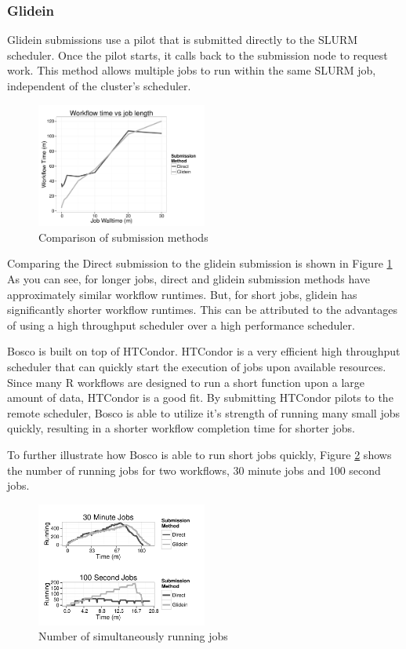 \documentclass[conference]{IEEEtran}
\begin{document}
\subsubsection{Glidein}
Glidein submissions use a pilot that is submitted directly to the SLURM scheduler.  Once the pilot starts, it calls back to the submission node to request work.  This method allows multiple jobs to run within the same SLURM job, independent of the cluster's scheduler.  

\begin{figure}[ht!]
\centering
\includegraphics[width=0.5\textwidth]{images/ComparisonPlot.pdf}
\caption{Comparison of submission methods}
\label{fig:comparesubmit}
\end{figure}

Comparing the Direct submission to the glidein submission is shown in Figure \ref{fig:comparesubmit}  As you can see, for longer jobs, direct and glidein submission methods have approximately similar workflow runtimes.  But, for short jobs, glidein has significantly shorter workflow runtimes.  This can be attributed to the advantages of using a high throughput scheduler over a high performance scheduler.

Bosco is built on top of HTCondor.  HTCondor is a very efficient high throughput scheduler that can quickly start the execution of jobs upon available resources.  Since many R workflows are designed to run a short function upon a large amount of data, HTCondor is a good fit.  By submitting HTCondor pilots to the remote scheduler, Bosco is able to utilize it's strength of running many small jobs quickly, resulting in a shorter workflow completion time for shorter jobs.

To further illustrate how Bosco is able to run short jobs quickly, Figure \ref{fig:runningjobs} shows the number of running jobs for two workflows, 30 minute jobs and 100 second jobs.

\begin{figure}[ht!]
\centering
\includegraphics[width=0.5\textwidth]{images/NumberRunning.pdf}

\caption{Number of simultaneously running jobs}
\label{fig:runningjobs}
\end{figure}
\end{document}
